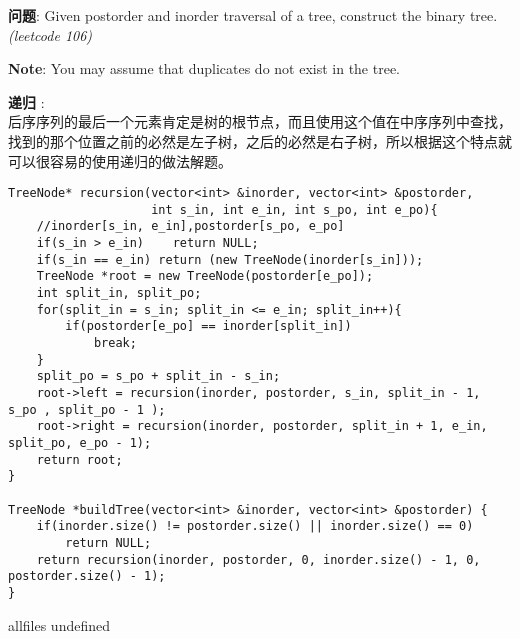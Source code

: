 \documentclass{article}
\begin{document}
\begin{CJK}{UTF8}{gbsn}     %

\else
    
\begin{description}
    \item{\textbf{问题}}: Given postorder and inorder traversal of a tree, construct the binary tree. \textit{(leetcode 106)}
    \item{\textbf{Note}}: You may assume that duplicates do not exist in the tree.
    \item{\textbf{递归}} : 
    \\后序序列的最后一个元素肯定是树的根节点，而且使用这个值在中序序列中查找，找到的那个位置之前的必然是左子树，之后的必然是右子树，所以根据这个特点就可以很容易的使用递归的做法解题。
    \begin{lstlisting}
TreeNode* recursion(vector<int> &inorder, vector<int> &postorder,
                    int s_in, int e_in, int s_po, int e_po){
    //inorder[s_in, e_in],postorder[s_po, e_po]
    if(s_in > e_in)    return NULL;
    if(s_in == e_in) return (new TreeNode(inorder[s_in]));
    TreeNode *root = new TreeNode(postorder[e_po]);
    int split_in, split_po;
    for(split_in = s_in; split_in <= e_in; split_in++){
        if(postorder[e_po] == inorder[split_in])
            break;
    }
    split_po = s_po + split_in - s_in;
    root->left = recursion(inorder, postorder, s_in, split_in - 1, s_po , split_po - 1 );
    root->right = recursion(inorder, postorder, split_in + 1, e_in, split_po, e_po - 1);
    return root;
}

TreeNode *buildTree(vector<int> &inorder, vector<int> &postorder) {
    if(inorder.size() != postorder.size() || inorder.size() == 0)
        return NULL;
    return recursion(inorder, postorder, 0, inorder.size() - 1, 0, postorder.size() - 1);
}
    \end{lstlisting}
    \textit{}
\end{description}

\fi

\ifx allfiles undefined
\end{CJK}
\end{document}
